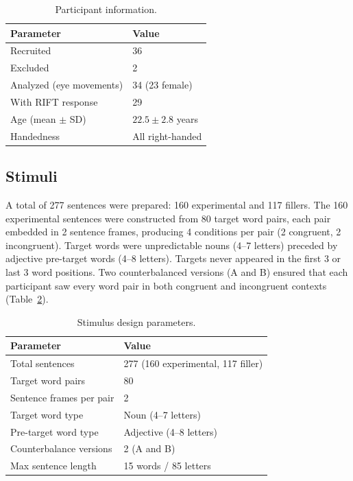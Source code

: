 \documentclass[12pt]{article}
\begin{document}
\begin{table}[ht]
\centering
\caption{Participant information.}
\label{tab:participants}
\begin{tabular}{ll}
\toprule
Parameter & Value \\
\midrule
Recruited & 36 \\
Excluded & 2 \\
Analyzed (eye movements) & 34 (23 female) \\
With RIFT response & 29 \\
Age (mean $\pm$ SD) & $22.5 \pm 2.8$ years \\
Handedness & All right-handed \\
\bottomrule
\end{tabular}
\end{table}

\subsection{Stimuli}

A total of 277 sentences were prepared: 160 experimental and 117 fillers. The 160 experimental sentences were constructed from 80 target word pairs, each pair embedded in 2 sentence frames, producing 4 conditions per pair (2 congruent, 2 incongruent). Target words were unpredictable nouns (4--7 letters) preceded by adjective pre-target words (4--8 letters). Targets never appeared in the first 3 or last 3 word positions. Two counterbalanced versions (A and B) ensured that each participant saw every word pair in both congruent and incongruent contexts (Table~\ref{tab:stimuli}).

\begin{table}[ht]
\centering
\caption{Stimulus design parameters.}
\label{tab:stimuli}
\begin{tabular}{ll}
\toprule
Parameter & Value \\
\midrule
Total sentences & 277 (160 experimental, 117 filler) \\
Target word pairs & 80 \\
Sentence frames per pair & 2 \\
Target word type & Noun (4--7 letters) \\
Pre-target word type & Adjective (4--8 letters) \\
Counterbalance versions & 2 (A and B) \\
Max sentence length & 15 words / 85 letters \\
\bottomrule
\end{tabular}
\end{table}
\end{document}
